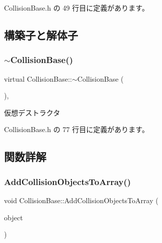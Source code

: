  Collision\+Base.\+h の 49 行目に定義があります。



\subsection{構築子と解体子}
\mbox{\label{class_collision_base_a095def3600633e2eb492bf24112e9dc3}} 
\subsubsection{\texorpdfstring{$\sim$\+Collision\+Base()}{~CollisionBase()}}
{\footnotesize\ttfamily virtual Collision\+Base\+::$\sim$\+Collision\+Base (\begin{DoxyParamCaption}{ }\end{DoxyParamCaption})\hspace{0.3cm}{\ttfamily [inline]}, {\ttfamily [virtual]}}



仮想デストラクタ 



 Collision\+Base.\+h の 77 行目に定義があります。



\subsection{関数詳解}
\mbox{\label{class_collision_base_ace98d75317a9f56bc6cada7980285b53}} 
\subsubsection{\texorpdfstring{Add\+Collision\+Objects\+To\+Array()}{AddCollisionObjectsToArray()}}
{\footnotesize\ttfamily void Collision\+Base\+::\+Add\+Collision\+Objects\+To\+Array (\begin{DoxyParamCaption}\item[{\mbox{\hyperlink{class_collision_objects}{Collision\+Objects}} $\ast$}]{object }\end{DoxyParamCaption})\hspace{0.3cm}{\ttfamily [inline]}}



